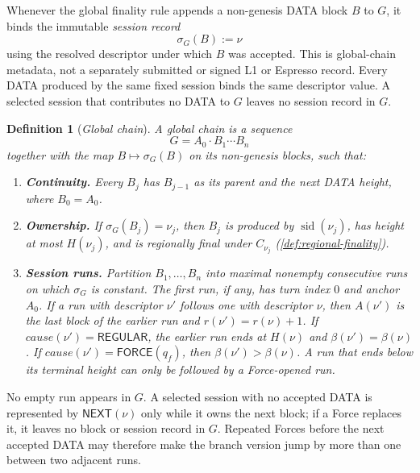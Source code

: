 \documentclass[11pt,a4paper]{article}
\newcommand{\tagg}[1]{\ensuremath{\mathsf{#1}}}
\newcommand{\defterm}[1]{\textcolor{rrBlue}{\textit{#1}}}
\newtheorem{definition}{Definition}[section]
\begin{document}
Whenever the global finality rule appends a non-genesis DATA block
$B$ to $G$, it binds the immutable \defterm{session record}
\[
 \sigma_G(B):=\nu
\]
using the resolved descriptor under which $B$ was accepted.  This is
global-chain metadata, not a separately submitted or signed L1 or
Espresso record.  Every DATA produced by the same fixed session binds
the same descriptor value.  A selected session that contributes no DATA
to $G$ leaves no session record in $G$.

\begin{definition}[\defterm{Global chain}]
\label{def:global-chain}
A global chain is a sequence
\[
 G=A_0\cdot B_1\cdots B_n
\]
together with the map $B\mapsto\sigma_G(B)$ on its non-genesis blocks,
such that:
\begin{enumerate}[label=(\roman*),itemsep=2pt]
\item \textbf{Continuity.} Every $B_j$ has $B_{j-1}$ as its parent and
the next DATA height, where $B_0=A_0$.
\item \textbf{Ownership.} If $\sigma_G(B_j)=\nu_j$, then $B_j$ is
produced by $\operatorname{sid}(\nu_j)$, has height at most $H(\nu_j)$,
and is regionally final under $C_{\nu_j}$
(\cref{def:regional-finality}).
\item \textbf{Session runs.} Partition $B_1,\ldots,B_n$ into maximal
nonempty consecutive runs on which $\sigma_G$ is constant.  The first
run, if any, has turn index $0$ and anchor $A_0$.  If a run with
descriptor $\nu'$ follows one with descriptor $\nu$, then
$A(\nu')$ is the last block of the earlier run and
$r(\nu')=r(\nu)+1$.  If
$\mathit{cause}(\nu')=\tagg{REGULAR}$, the earlier run ends at
$H(\nu)$ and $\beta(\nu')=\beta(\nu)$.  If
$\mathit{cause}(\nu')=\tagg{FORCE}(q_f)$, then
$\beta(\nu')>\beta(\nu)$.  A run that ends below its terminal height can
only be followed by a Force-opened run.
\end{enumerate}
\end{definition}
No empty run appears in $G$.  A selected session with no accepted DATA
is represented by $\tagg{NEXT}(\nu)$ only while it owns the next block;
if a Force replaces it, it leaves no block or session record in $G$.
Repeated Forces before the next accepted DATA may therefore make the
branch version jump by more than one between two adjacent runs.
\end{document}
